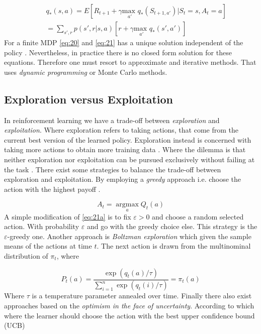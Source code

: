\documentclass{kththesis}
\theoremstyle{definition}
\begin{document}
\begin{equation}
\label{eq:21}
\begin{aligned}
& & q_{*}(s,a) = 
E[R_{t+1} + \gamma \underset{a'}{\text{max }}q_{*}(S_{t+1, a'}) | S_t =s, A_t = a] \\
& & =  \sum_{s', r}^{}{p(s', r | s,a)}[r + \gamma \underset{a'}{\text{max }}q_{*}(s',a')]
\end{aligned}
\end{equation}
For a finite MDP \autoref{eq:20} and \autoref{eq:21} has a unique solution independent of the policy \parencite{sutton1998reinforcement}. Nevertheless, in practice there is no closed form solution for these equations. Therefore one must resort to approximate and iterative methods. That uses \textit{dynamic programming} or Monte Carlo methods.

\subsection{Exploration versus Exploitation}
In reinforcement learning we have a trade-off between \textit{exploration} and \textit{exploitation}. Where exploration refers to taking actions, that come from the current best version of the learned policy. Exploration instead is concerned with taking more actions to obtain more training data \parencite{goodfellow2016deep}. Where the dilemma is that neither exploration nor exploitation can be pursued exclusively without failing at the task \parencite{sutton1998reinforcement}. There exist some strategies to balance the trade-off between exploration and exploitation. By employing a \textit{greedy} approach i.e. choose the action with the highest payoff \parencite{sutton1998reinforcement, szepesvari2009algorithms}.

\begin{equation}
    \label{eq:21a}
    A_t = \underset{a}{\operatorname{argmax}}Q_t(a)
\end{equation}
A simple modification of \autoref{eq:21a} is to fix $\varepsilon > 0$ and choose a random selected action. With probability $\varepsilon$ and go with the greedy choice else. This strategy is the $\varepsilon$-greedy one. Another approach is \textit{Boltzman exploration} \parencite{sutton1998reinforcement,szepesvari2009algorithms} which given the sample means of the actions at time $t$. The next action is drawn from the multinominal distribution of $\pi_t$, where 

\begin{equation}
    \label{eq:21b}
    P_t(a) = \frac{\exp{(q_{t}(a)/\tau)}}{ \sum_{i=1}^{n}{\exp{(q_{t}(i)/ \tau)}}} = \pi_t(a)
\end{equation}
Where $ \tau$ is a temperature parameter annealed over time.
Finally there also exist approaches based on the \textit{optimism in the face of uncertainty}. According to which where the learner should choose the action with the best upper confidence bound (UCB) \parencite{sutton1998reinforcement, szepesvari2009algorithms}
\end{document}
